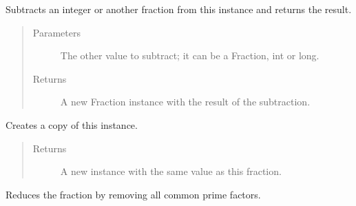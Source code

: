 \documentclass[letterpaper,10pt,english]{sphinxmanual}
\begin{document}
\begin{fulllineitems}
\begin{fulllineitems}
\begin{quote}
\begin{description}
\begin{itemize}
\end{itemize}


\end{description}\end{quote}

\end{fulllineitems}


\begin{fulllineitems}
\label{\detokenize{fraction:fraction.Fraction.__sub__}}
Subtracts an integer or another fraction from this instance and returns the result.
\begin{quote}\begin{description}
\item[{Parameters}] \leavevmode
{} \textendash{} The other value to subtract; it can be a Fraction, int or long.

\item[{Returns}] \leavevmode
A new Fraction instance with the result of the subtraction.

\end{description}\end{quote}

\end{fulllineitems}


\begin{fulllineitems}
\label{\detokenize{fraction:fraction.Fraction.clone}}
Creates a copy of this instance.
\begin{quote}\begin{description}
\item[{Returns}] \leavevmode
A new instance with the same value as this fraction.

\end{description}\end{quote}

\end{fulllineitems}


\begin{fulllineitems}
\label{\detokenize{fraction:fraction.Fraction.reduce}}
Reduces the fraction by removing all common prime factors.

\end{fulllineitems}


\end{fulllineitems}
\end{document}

